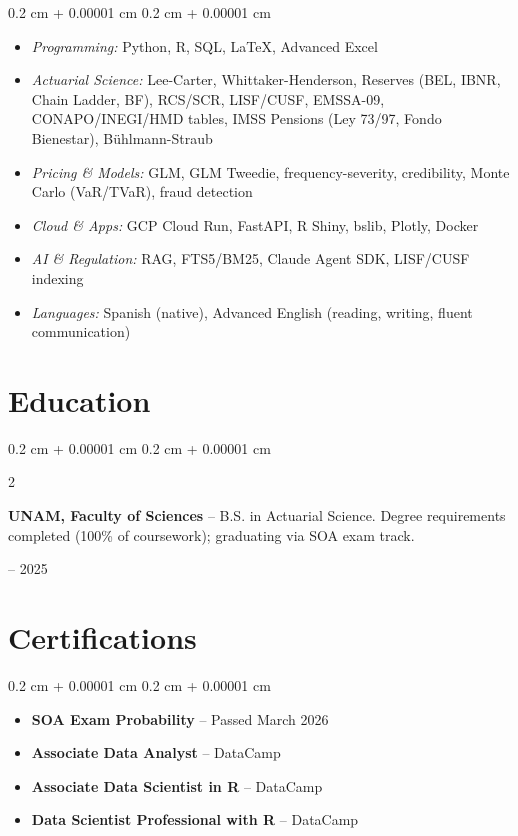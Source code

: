 \documentclass[10pt, letterpaper]{article}
\newenvironment{highlightsforbulletentries}{
    \begin{itemize}[
        topsep=0 cm,parsep=0.02 cm,
        partopsep=0pt,
        itemsep=0pt,
        leftmargin=10pt
    ]
}{
    \end{itemize}
}
\newenvironment{onecolentry}{
    \begin{adjustwidth}{
        0.2 cm + 0.00001 cm
    }{
        0.2 cm + 0.00001 cm
    }
}{
    \end{adjustwidth}
}
\newenvironment{twocolentry}[2][]{
    \onecolentry
    \def\secondColumn{#2}
    \setcolumnwidth{\fill, 4.0 cm}
    \begin{paracol}{2}
}{
    \switchcolumn \raggedleft \secondColumn
    \end{paracol}
    \endonecolentry
}
\let\hrefWithoutArrow\href
\renewcommand{\href}[2]{\hrefWithoutArrow{#1}{\ifthenelse{\equal{#2}{}}{ }{#2 }\raisebox{.15ex}{\footnotesize \faExternalLink*}}}
\begin{document}
\begin{onecolentry}
    \begin{highlightsforbulletentries}
        \item \textit{Programming:} Python, R, SQL, \LaTeX, Advanced Excel
        \item \textit{Actuarial Science:} Lee-Carter, Whittaker-Henderson, Reserves (BEL, IBNR, Chain Ladder, BF), RCS/SCR, LISF/CUSF, EMSSA-09, CONAPO/INEGI/HMD tables, IMSS Pensions (Ley 73/97, Fondo Bienestar), Bühlmann-Straub
        \item \textit{Pricing \& Models:} GLM, GLM Tweedie, frequency-severity, credibility, Monte Carlo (VaR/TVaR), fraud detection
        \item \textit{Cloud \& Apps:} GCP Cloud Run, FastAPI, R Shiny, bslib, Plotly, Docker
        \item \textit{AI \& Regulation:} RAG, FTS5/BM25, Claude Agent SDK, LISF/CUSF indexing
        \item \textit{Languages:} Spanish (native), Advanced English (reading, writing, fluent communication)
    \end{highlightsforbulletentries}
\end{onecolentry}


    \section{Education}

        \begin{twocolentry}{2021 -- 2025}
            \textbf{UNAM, Faculty of Sciences} -- B.S. in Actuarial Science. Degree requirements completed (100\% of coursework); graduating via SOA exam track.
        \end{twocolentry}

    \section{Certifications}

    \begin{onecolentry}
        \begin{highlightsforbulletentries}
            \item \textbf{SOA Exam Probability} -- Passed March 2026 \href{https://drive.google.com/file/d/1rt3emgBnPpQi7NiXkBQeA5WwJTV0JuAf/view?usp=sharing}{}
            \item \textbf{Associate Data Analyst} -- DataCamp \href{https://drive.google.com/drive/folders/1-QUuVH3zPBPsl6RhUvuUWxpZkP1i8TYb?usp=sharing}{}
            \item \textbf{Associate Data Scientist in R} -- DataCamp \href{https://drive.google.com/file/d/1xVLk15A1LBbyXH1fZnd4eBTaJ4d8FLLO/view?usp=drive_link}{}
            \item \textbf{Data Scientist Professional with R} -- DataCamp \href{https://drive.google.com/file/d/1Woe6xqxofloFZ9uM2f5VsdGxY-WQWCRI/view?usp=drive_link}{}
        \end{highlightsforbulletentries}
    \end{onecolentry}
\end{document}
